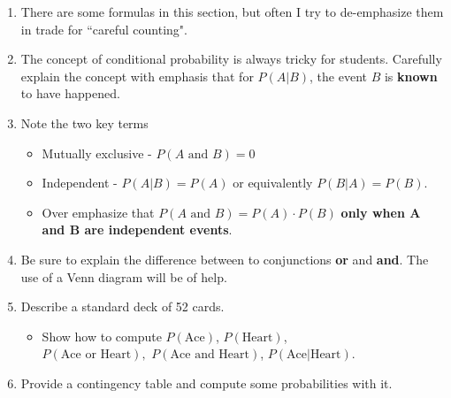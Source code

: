 \documentclass{article}
\begin{document}
\begin{enumerate}

    \item There are some formulas in this section, but often I try to de-emphasize them in trade for ``careful counting". 
    
    \item The concept of conditional probability is always tricky for students. Carefully explain the concept with emphasis that for $P(A | B)$, the event $B$ is \textbf{known} to have happened.
    
    \item Note the two key terms
    
        \begin{itemize}
        
            \item Mutually exclusive - $P(A \mbox{ and } B) = 0$
            
            \item Independent - $P(A|B) = P(A)$ or equivalently $P(B|A) = P(B)$.
            
            \item Over emphasize that $P(A \mbox{ and } B) = P(A) \cdot P(B)$ \textbf{only when A and B are independent events}.
            
        \end{itemize}
        
    \item Be sure to explain the difference between to conjunctions \textbf{or} and \textbf{and}. The use of a Venn diagram will be of help.
    
    \item Describe a standard deck of 52 cards.
    
        \begin{itemize}
        
            \item Show how to compute $P(\mbox{Ace})$, $P(\mbox{Heart})$, \\ $P(\mbox{Ace or Heart}),$ $P(\mbox{Ace and Heart})$, $P(\mbox{Ace} | \mbox{Heart})$.
            
        \end{itemize}
        
    \item Provide a contingency table and compute some probabilities with it. 
    
    \renewcommand{\arraystretch}{1.2}
    

\end{enumerate}
\end{document}
